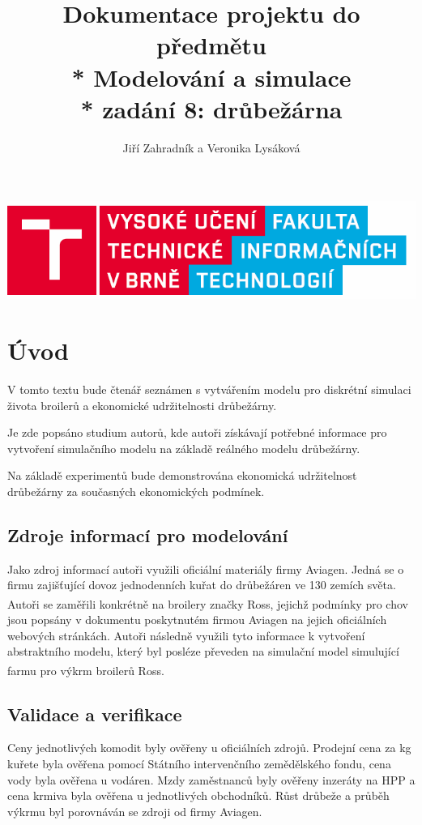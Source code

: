 \documentclass[a4paper,10pt]{article}
\title{Dokumentace projektu do předmětu \\* Modelování a simulace\\* zadání 8: drůbežárna}
\author{Jiří Zahradník a Veronika Lysáková}
\date{}
\begin{document}
\maketitle
\includegraphics[scale=0.5]{fitnewb.png}
\pagebreak

\renewcommand{\contentsname}{Obsah}
\tableofcontents


\renewcommand{\figurename}{Obrázek}


\pagebreak

%
%

\section{Úvod}
V tomto textu bude čtenář seznámen s vytvářením modelu pro diskrétní simulaci 
života broilerů a ekonomické udržitelnosti drůbežárny.
\par 
Je zde popsáno studium autorů, kde autoři získávají potřebné informace
pro vytvoření simulačního modelu na základě reálného modelu drůbežárny.
\par
Na základě experimentů bude demonstrována ekonomická udržitelnost
drůbežárny za současných ekonomických podmínek.

\subsection{Zdroje informací pro modelování\cite{modelovani}}\label{zdroje}
Jako zdroj informací autoři využili oficiální materiály firmy Aviagen\cite{aviagen}.
Jedná se o firmu zajišťující dovoz jednodenních kuřat do drůbežáren ve 130 zemích světa.
Autoři se zaměřili konkrétně na broilery značky Ross\textsuperscript{\textregistered},
jejichž podmínky pro chov jsou popsány v dokumentu poskytnutém firmou Aviagen\cite{ross}
na jejich oficiálních webových stránkách. Autoři následně využili tyto informace k
vytvoření abstraktního modelu\cite{abstract_model}, který byl posléze převeden na simulační model\cite{simulation_model}
simulující farmu pro výkrm broilerů Ross\textsuperscript{\textregistered}. 

\subsection{Validace a verifikace}\label{validaceVerifikace}
Ceny jednotlivých komodit byly ověřeny u oficiálních zdrojů.
Prodejní cena za kg kuřete byla ověřena pomocí Státního intervenčního
zemědělského fondu\cite{szif}, cena vody byla ověřena u vodáren\cite{vodarny}.
Mzdy zaměstnanců byly ověřeny inzeráty na HPP a cena krmiva byla ověřena
u jednotlivých obchodníků. Růst drůbeže a průběh výkrmu byl porovnáván
se zdroji od firmy Aviagen\cite{ross}.
\end{document}
